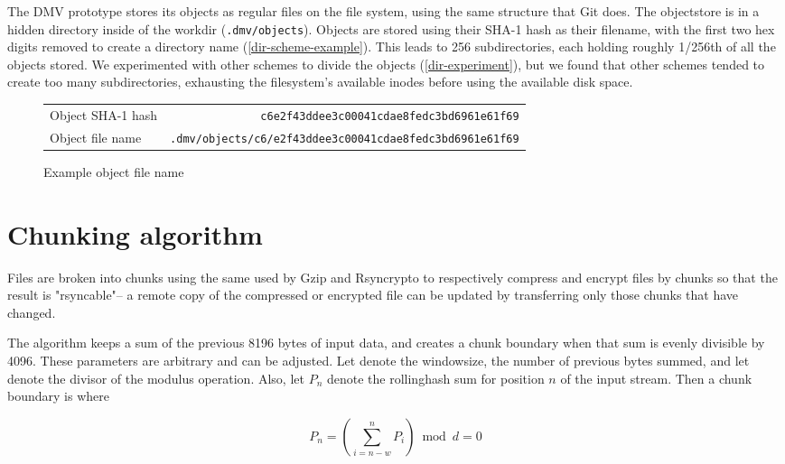 The \gls{DMV} prototype stores its objects as regular files on the file system,
using the same structure that Git does. The \gls{objectstore} is in a hidden
directory inside of the \gls{workdir} (\lstinline{.dmv/objects}). Objects are
stored using their SHA-1 hash as their filename, with the first two hex digits
removed to create a directory name (\autoref{dir-scheme-example}). This leads to
\num{256} subdirectories, each holding roughly \num{1/256}th of all the objects
stored. We experimented with other schemes to divide the objects
(\autoref{dir-experiment}), but we found that other schemes tended to create too
many subdirectories, exhausting the filesystem's available inodes before using
the available disk space.

\begin{figure}[h]
    \caption{Example object file name}
    \label{dir-scheme-example}
    \begin{tabular}{ l r }
        Object SHA-1 hash & \lstinline{c6e2f43ddee3c00041cdae8fedc3bd6961e61f69} \\
        Object file name & \lstinline{.dmv/objects/c6/e2f43ddee3c00041cdae8fedc3bd6961e61f69} \\
    \end{tabular}
\end{figure}

%


\section{Chunking algorithm}\label{chunking-algoritm}

Files are broken into chunks using the same  used by Gzip
and Rsyncrypto\cite{rsyncrypto_algorithm} to respectively compress and encrypt
files by chunks so that the result is "rsyncable"-- a remote copy of the
compressed or encrypted file can be updated by transferring only those chunks
that have changed.

The algorithm keeps a sum of the previous \num{8196} bytes of input data, and
creates a chunk boundary when that sum is evenly divisible by \num{4096}. These
parameters are arbitrary and can be adjusted. Let  denote
the \gls{windowsize}, the number of previous bytes summed, and let
 denote the \gls{divisor} of the modulus operation. Also, let
$P_n$ denote the \gls{rollinghash} sum for position $n$ of the input stream.
Then a chunk boundary is where

\begin{equation}
    P_n = \left( \sum_{i = n - w }^{n}{P_i} \right) \bmod d = 0
\end{equation}

